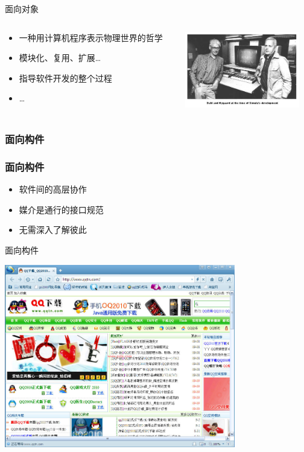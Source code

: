 \begin{frame}{面向对象}
  \begin{columns}
    \begin{column}{.5\textwidth}
      \begin{itemize}
        \item 一种用计算机程序表示物理世界的哲学
          \pause
        \item 模块化、复用、扩展\dots
          \pause
        \item 指导软件开发的整个过程
        \item \dots
      \end{itemize}
    \end{column}
    \begin{column}{.5\textwidth}
      \includegraphics[width=5cm]{dahl_nygaard.jpg}
    \end{column}
  \end{columns}
\end{frame}

\subsubsection{面向构件}

\begin{frame}[fragile]
  \frametitle{面向构件}
  \begin{itemize}
    \item 软件间的高层协作
    \item 媒介是通行的接口规范
    \item 无需深入了解彼此
  \end{itemize}
\end{frame}

\begin{frame}{面向构件}
  \begin{center}
    \includegraphics[height=8cm]{qqbrowser.jpg}
  \end{center}
\end{frame}


